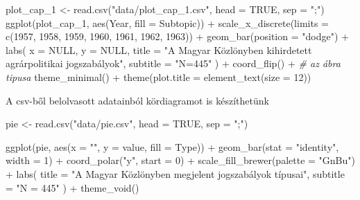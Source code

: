 \documentclass[
]{book}
\newenvironment{Shaded}{\begin{snugshade}}{\end{snugshade}}
\newcommand{\AttributeTok}[1]{\textcolor[rgb]{0.77,0.63,0.00}{#1}}
\newcommand{\CommentTok}[1]{\textcolor[rgb]{0.56,0.35,0.01}{\textit{#1}}}
\newcommand{\ConstantTok}[1]{\textcolor[rgb]{0.00,0.00,0.00}{#1}}
\newcommand{\DecValTok}[1]{\textcolor[rgb]{0.00,0.00,0.81}{#1}}
\newcommand{\FunctionTok}[1]{\textcolor[rgb]{0.00,0.00,0.00}{#1}}
\newcommand{\NormalTok}[1]{#1}
\newcommand{\OtherTok}[1]{\textcolor[rgb]{0.56,0.35,0.01}{#1}}
\newcommand{\SpecialCharTok}[1]{\textcolor[rgb]{0.00,0.00,0.00}{#1}}
\newcommand{\StringTok}[1]{\textcolor[rgb]{0.31,0.60,0.02}{#1}}
\begin{document}
\begin{Shaded}
\begin{Highlighting}[]
\NormalTok{plot\_cap\_1 }\OtherTok{\textless{}{-}} \FunctionTok{read.csv}\NormalTok{(}\StringTok{"data/plot\_cap\_1.csv"}\NormalTok{, }\AttributeTok{head =} \ConstantTok{TRUE}\NormalTok{, }\AttributeTok{sep =} \StringTok{";"}\NormalTok{) }
\FunctionTok{ggplot}\NormalTok{(plot\_cap\_1, }\FunctionTok{aes}\NormalTok{(Year, }\AttributeTok{fill =}\NormalTok{ Subtopic)) }\SpecialCharTok{+} 
  \FunctionTok{scale\_x\_discrete}\NormalTok{(}\AttributeTok{limits =} \FunctionTok{c}\NormalTok{(}\DecValTok{1957}\NormalTok{, }\DecValTok{1958}\NormalTok{, }\DecValTok{1959}\NormalTok{, }\DecValTok{1960}\NormalTok{, }\DecValTok{1961}\NormalTok{, }\DecValTok{1962}\NormalTok{, }\DecValTok{1963}\NormalTok{)) }\SpecialCharTok{+}
  \FunctionTok{geom\_bar}\NormalTok{(}\AttributeTok{position =} \StringTok{"dodge"}\NormalTok{) }\SpecialCharTok{+} 
  \FunctionTok{labs}\NormalTok{(}
    \AttributeTok{x =} \ConstantTok{NULL}\NormalTok{, }\AttributeTok{y =} \ConstantTok{NULL}\NormalTok{, }
    \AttributeTok{title =} \StringTok{"A Magyar Közlönyben kihirdetett agrárpolitikai jogszabályok"}\NormalTok{, }
    \AttributeTok{subtitle =} \StringTok{"N=445"}
\NormalTok{  ) }\SpecialCharTok{+} 
  \FunctionTok{coord\_flip}\NormalTok{() }\SpecialCharTok{+} \CommentTok{\# az ábra tipusa}
  \FunctionTok{theme\_minimal}\NormalTok{() }\SpecialCharTok{+}
  \FunctionTok{theme}\NormalTok{(}\AttributeTok{plot.title =} \FunctionTok{element\_text}\NormalTok{(}\AttributeTok{size =} \DecValTok{12}\NormalTok{)) }
\end{Highlighting}
\end{Shaded}

A csv-ből belolvasott adatainból kördiagramot is készíthetünk

\begin{Shaded}
\begin{Highlighting}[]
\NormalTok{pie }\OtherTok{\textless{}{-}} \FunctionTok{read.csv}\NormalTok{(}\StringTok{"data/pie.csv"}\NormalTok{, }\AttributeTok{head =} \ConstantTok{TRUE}\NormalTok{, }\AttributeTok{sep =} \StringTok{";"}\NormalTok{)}

\FunctionTok{ggplot}\NormalTok{(pie, }\FunctionTok{aes}\NormalTok{(}\AttributeTok{x =} \StringTok{""}\NormalTok{, }\AttributeTok{y =}\NormalTok{ value, }\AttributeTok{fill =}\NormalTok{ Type)) }\SpecialCharTok{+}
  \FunctionTok{geom\_bar}\NormalTok{(}\AttributeTok{stat =} \StringTok{"identity"}\NormalTok{, }\AttributeTok{width =} \DecValTok{1}\NormalTok{) }\SpecialCharTok{+}
  \FunctionTok{coord\_polar}\NormalTok{(}\StringTok{"y"}\NormalTok{, }\AttributeTok{start =} \DecValTok{0}\NormalTok{) }\SpecialCharTok{+}
  \FunctionTok{scale\_fill\_brewer}\NormalTok{(}\AttributeTok{palette =} \StringTok{"GnBu"}\NormalTok{) }\SpecialCharTok{+}
  \FunctionTok{labs}\NormalTok{(}
    \AttributeTok{title =} \StringTok{"A Magyar Közlönyben megjelent jogszabályok típusai"}\NormalTok{,}
    \AttributeTok{subtitle =} \StringTok{"N = 445"}
\NormalTok{  ) }\SpecialCharTok{+}
  \FunctionTok{theme\_void}\NormalTok{()}
\end{Highlighting}
\end{Shaded}


\backmatter
\end{document}
